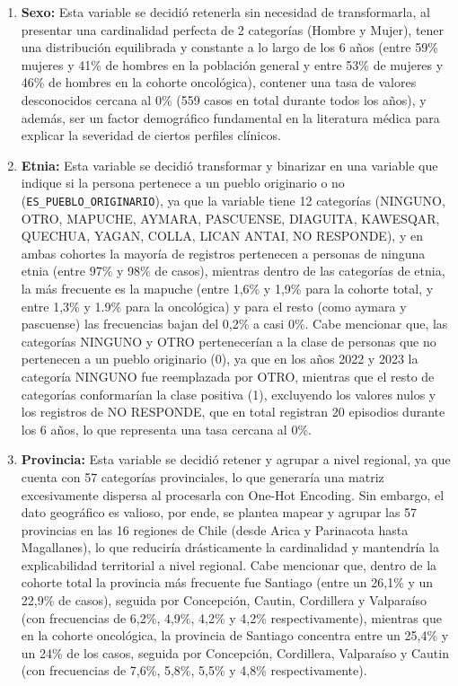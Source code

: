 \begin{enumerate}
    \item \textbf{Sexo:} Esta variable se decidió retenerla sin necesidad de transformarla, al presentar una cardinalidad perfecta de 2 categorías (Hombre y Mujer), tener una distribución equilibrada y constante a lo largo de los 6 años (entre 59\% mujeres y 41\% de hombres en la población general y entre 53\% de mujeres y 46\% de hombres en la cohorte oncológica), contener una tasa de valores desconocidos cercana al 0\% (559 casos en total durante todos los años), y además, ser un factor demográfico fundamental en la literatura médica para explicar la severidad de ciertos perfiles clínicos.
    \item \textbf{Etnia:} Esta variable se decidió transformar y binarizar en una variable que indique si la persona pertenece a un pueblo originario o no (\texttt{ES\_PUEBLO\_ORIGINARIO}), ya que la variable tiene 12 categorías (NINGUNO, OTRO, MAPUCHE, AYMARA, PASCUENSE, DIAGUITA, KAWESQAR, QUECHUA, YAGAN, COLLA, LICAN ANTAI, NO RESPONDE), y en ambas cohortes la mayoría de registros pertenecen a personas de ninguna etnia (entre 97\% y 98\% de casos), mientras dentro de las categorías de etnia, la más frecuente es la mapuche (entre 1,6\% y 1,9\% para la cohorte total, y entre 1,3\% y 1.9\% para la oncológica) y para el resto (como aymara y pascuense) las frecuencias bajan del 0,2\% a casi 0\%. Cabe mencionar que, las categorías NINGUNO y OTRO pertenecerían a la clase de personas que no pertenecen a un pueblo originario (0), ya que en los años 2022 y 2023 la categoría NINGUNO fue reemplazada por OTRO, mientras que el resto de categorías conformarían la clase positiva (1), excluyendo los valores nulos y los registros de NO RESPONDE, que en total registran 20 episodios durante los 6 años, lo que representa una tasa cercana al 0\%.
    \item \textbf{Provincia:} Esta variable se decidió retener y agrupar a nivel regional, ya que cuenta con 57 categorías provinciales, lo que generaría una matriz excesivamente dispersa al procesarla con One-Hot Encoding. Sin embargo, el dato geográfico es valioso, por ende, se plantea mapear y agrupar las 57 provincias en las 16 regiones de Chile (desde Arica y Parinacota hasta Magallanes), lo que reduciría drásticamente la cardinalidad y mantendría la explicabilidad territorial a nivel regional. Cabe mencionar que, dentro de la cohorte total la provincia más frecuente fue Santiago (entre un 26,1\% y un 22,9\% de casos), seguida por Concepción, Cautin, Cordillera y Valparaíso (con frecuencias de 6,2\%, 4,9\%, 4,2\% y 4,2\% respectivamente), mientras que en la cohorte oncológica, la provincia de Santiago concentra entre un 25,4\% y un 24\% de los casos, seguida por Concepción, Cordillera, Valparaíso y Cautin (con frecuencias de 7,6\%, 5,8\%, 5,5\% y 4,8\% respectivamente).

\end{enumerate}
